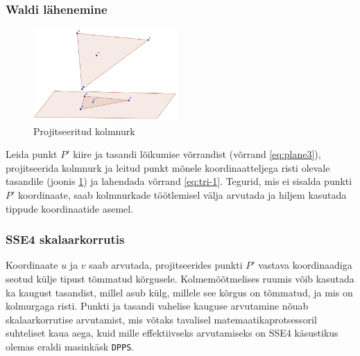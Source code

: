 \documentclass[a4paper,12pt]{report}
\begin{document}
\subsubsection{Waldi lähenemine}
\begin{figure}
\includegraphics[width=0.49\textwidth]{tri-wald}
\caption{Projitseeritud kolmnurk}
\label{fig:tri-wald}
\end{figure}
Leida punkt \(P'\) kiire ja tasandi lõikumise võrrandist (võrrand
\ref{eq:plane3}), projitseerida kolmnurk ja leitud punkt mõnele koordinaatteljega
risti olevale tasandile (joonis \ref{fig:tri-wald}) ja lahendada võrrand \ref{eq:tri-1}. Tegurid, mis
ei sisalda punkti \(P'\) koordinaate, saab kolmnurkade töötlemisel välja
arvutada ja hiljem kasutada tippude koordinaatide asemel.
\cite[lk. 91]{wald::PhD}

\subsubsection{SSE4 skalaarkorrutis}
Koordinaate \(u\) ja \(v\) saab arvutada, projitseerides punkti \(P'\)
vastava koordinaadiga seotud külje tipust tõmmatud kõrgusele. Kolmemõõtmelises
ruumis võib kasutada ka kaugust tasandist, millel asub külg, millele see
kõrgus on tõmmatud, ja mis on kolmurgaga risti. Punkti ja tasandi vahelise
kauguse arvutamine nõuab skalaarkorrutise arvutamist, mis võtaks tavalisel
matemaatikaprotsessoril suhteliset kaua aega, kuid mille effektiivseks 
arvutamiseks on SSE4 käsustikus olemas eraldi masinkäsk \texttt{DPPS}.
\cite{TriSSE4}
\end{document}

